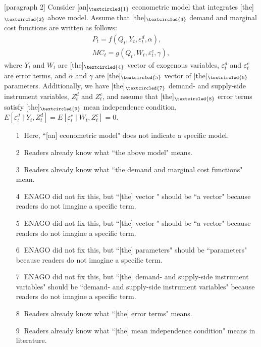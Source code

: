 \documentclass[11pt, a4paper]{article}
\begin{document}
\newpage

[paragraph 2]
Consider [an]$_{\textcircled{1}}$ econometric model that integrates [the]$_{\textcircled{2}}$ above model.
Assume that [the]$_{\textcircled{3}}$ demand and marginal cost functions are written as follows: 
\begin{align}
    P_t = f(Q_{t}, Y_t, \varepsilon^{d}_{t}, \alpha), \label{eq:demand}\\
    MC_t = g(Q_{t}, W_{t}, \varepsilon^{c}_{t}, \gamma),\label{eq:marginal_cost}
\end{align}
where $Y_t$ and $W_{t}$ are [the]$_{\textcircled{4}}$ vector of exogenous variables, $\varepsilon^{d}_{t}$ and $\varepsilon^{c}_{t}$ are error terms, and $\alpha$ and $\gamma$ are [the]$_{\textcircled{5}}$ vector of [the]$_{\textcircled{6}}$ parameters.
Additionally, we have [the]$_{\textcircled{7}}$ demand- and supply-side instrument variables, $Z^{d}_{t}$ and $Z^{c}_{t}$, and assume that [the]$_{\textcircled{8}}$ error terms satisfy [the]$_{\textcircled{9}}$ mean independence condition, $E[\varepsilon^{d}_{t}\mid Y_t, Z^{d}_{t}] = E[\varepsilon^{c}_{t} \mid W_{t}, Z^{c}_{t}] =0$.

\begin{itemize}
    \item[\textcircled{1}] Here, ``[an] econometric model" does not indicate a specific model.
    \item[\textcircled{2}] Readers already know what ``the above model"  means.
    \item[\textcircled{3}] Readers already know what ``the demand and marginal cost functions" mean.
    \item[\textcircled{4}] ENAGO did not fix this, but ``[the] vector " should be ``a vector" because readers do not imagine a specific term.
    \item[\textcircled{5}] ENAGO did not fix this, but ``[the] vector " should be ``a vector" because readers do not imagine a specific term.
    \item[\textcircled{6}] ENAGO did not fix this, but ``[the] parameters" should be ``parameters" because readers do not imagine a specific term.
    \item[\textcircled{7}] ENAGO did not fix this, but ``[the] demand- and supply-side instrument variables" should be ``demand- and supply-side instrument variables" because readers do not imagine a specific term.
    \item[\textcircled{8}]  Readers already know what ``[the] error terms"  means.
    \item[\textcircled{9}] Readers already know what ``[the] mean independence condition"  means in literature.
\end{itemize}
\end{document}
